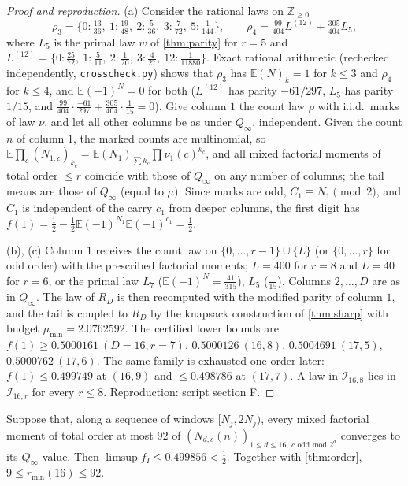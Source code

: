 \documentclass[11pt]{article}
\newcommand{\Ex}{\mathbb E}
\newcommand{\Qinf}{{Q_\infty}}
\begin{document}
\begin{proof}[Proof and reproduction]
(a) Consider the rational laws on $\mathbb Z_{\ge0}$
\[
\rho_3=\{0:\tfrac{13}{36},\ 1:\tfrac{19}{48},\ 2:\tfrac5{36},\ 3:\tfrac7{72},\ 5:\tfrac1{144}\},\qquad
\rho_4=\tfrac{99}{404}L^{(12)}+\tfrac{305}{404}L_5,
\]
where $L_5$ is the primal law $w$ of \cref{thm:parity} for $r=5$ and $L^{(12)}=\{0:\tfrac{25}{72},\ 1:\tfrac5{11},\ 2:\tfrac1{20},\ 3:\tfrac4{27},\ 12:\tfrac1{11880}\}$. Exact rational arithmetic (rechecked independently, \texttt{crosscheck.py}) shows that $\rho_3$ has $\Ex(N)_k=1$ for $k\le3$ and $\rho_4$ for $k\le4$, and $\Ex(-1)^N=0$ for both ($L^{(12)}$ has parity $-61/297$, $L_5$ has parity $1/15$, and $\tfrac{99}{404}\cdot\tfrac{-61}{297}+\tfrac{305}{404}\cdot\tfrac1{15}=0$). Give column $1$ the count law $\rho$ with i.i.d.\ marks of law $\nu$, and let all other columns be as under $\Qinf$, independent. Given the count $n$ of column $1$, the marked counts are multinomial, so $\Ex\prod_c(N_{1,c})_{k_c}=\Ex(N_1)_{\sum k_c}\prod\nu_1(c)^{k_c}$, and all mixed factorial moments of total order $\le r$ coincide with those of $\Qinf$ on any number of columns; the tail means are those of $\Qinf$ (equal to $\mu$). Since marks are odd, $C_1\equiv N_1\pmod2$, and $C_1$ is independent of the carry $c_1$ from deeper columns, the first digit has $f(1)=\tfrac12-\tfrac12\Ex(-1)^{N_1}\Ex(-1)^{c_1}=\tfrac12$.

(b), (c) Column $1$ receives the count law on $\{0,\dots,r-1\}\cup\{L\}$ (or $\{0,\dots,r\}$ for odd order) with the prescribed factorial moments; $L=400$ for $r=8$ and $L=40$ for $r=6$, or the primal law $L_7$ ($\Ex(-1)^N=\tfrac{41}{315}$), $L_5$ ($\tfrac1{15}$). Columns $2,\dots,D$ are as in $\Qinf$. The law of $R_D$ is then recomputed with the modified parity of column $1$, and the tail is coupled to $R_D$ by the knapsack construction of \cref{thm:sharp} with budget $\mu_{\min}=2.0762592$. The certified lower bounds are $f(1)\ge0.5000161\ (D=16,r=7)$, $0.5000126\ (16,8)$, $0.5004691\ (17,5)$, $0.5000762\ (17,6)$. The same family is exhausted one order later: $f(1)\le0.499749$ at $(16,9)$ and $\le0.498786$ at $(17,7)$. A law in $\mathcal I_{16,8}$ lies in $\mathcal I_{16,r}$ for every $r\le8$. Reproduction: script section F.
\end{proof}

\begin{theorem}\label{thm:92}
Suppose that, along a sequence of windows $[N_j,2N_j)$, every mixed factorial moment of total order at most $92$ of $(N_{d,c}(n))_{1\le d\le16,\ c\text{ odd mod }2^d}$ converges to its $\Qinf$ value. Then $\limsup f_I\le0.499856<\tfrac12$. Together with \cref{thm:order}, $9\le r_{\min}(16)\le92$.
\end{theorem}
\end{document}
